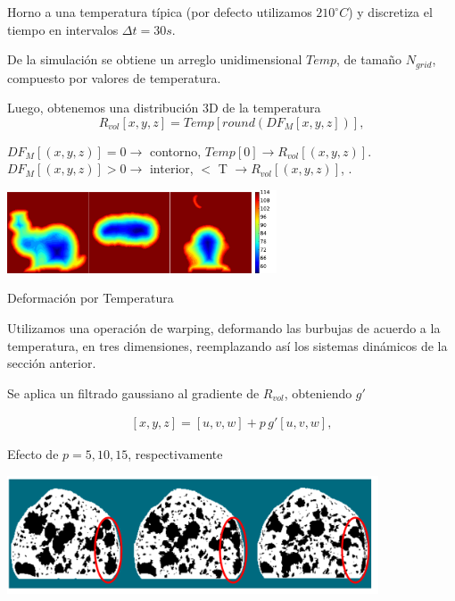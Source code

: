 \documentclass[spanish]{beamer}
\begin{document}
\begin{frame}
Horno a una temperatura típica (por defecto utilizamos $210^{\circ}C$) y discretiza el tiempo en intervalos $\Delta t = 30s$.


De la simulación se obtiene un arreglo unidimensional $Temp$, de tamaño $N_{grid}$, compuesto por valores de temperatura.

Luego, obtenemos una distribución 3D de la temperatura
\begin{equation*}
\displaystyle R_{vol}[x,y,z] = Temp[ round( DF_{M}[x,y,z] ) ], 
\end{equation*}

$DF_{M}[(x,y,z)] = 0 \rightarrow$ contorno, $Temp[0] \rightarrow R_{vol}[(x,y,z)]$.
$DF_{M}[(x,y,z)] > 0 \rightarrow$ interior, $<$ T  $\rightarrow R_{vol}[(x,y,z)]$, .

\centerline{\includegraphics[width=8cm]{../figures/tempsbunny}}
\end{frame}

\begin{frame}{Deformación por Temperatura}

Utilizamos una operación de warping, deformando las burbujas de acuerdo a la temperatura, en tres dimensiones, reemplazando así los sistemas dinámicos de la sección anterior.

Se aplica un filtrado gaussiano al gradiente de $R_{vol}$, obteniendo $g'$

\begin{align*}
\displaystyle
[x,y,z] = [u,v,w] + p\, g'[u,v,w],
\end{align*}

Efecto de $p = 5,10,15$, respectivamente
\centerline{\includegraphics[width=11cm]{../figures/parameterp}}

\end{frame}
\end{document}
